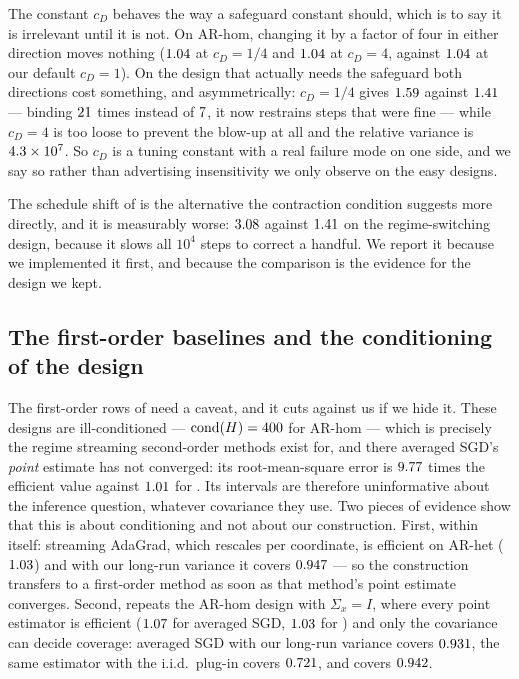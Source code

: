 The constant $c_D$ behaves the way a safeguard constant should, which is to say it is irrelevant
until it is not. On AR-hom, changing it by a factor of four in either direction moves nothing
($1.04$ at $c_D=1/4$ and $1.04$ at $c_D=4$, against
$1.04$ at our default $c_D=1$). On the design that actually needs the safeguard both
directions cost something, and asymmetrically: $c_D=1/4$ gives $1.59$ against
$1.41$ --- binding $21$ times instead of
$7$, it now restrains steps that were fine --- while $c_D=4$ is too loose to
prevent the blow-up at all and the relative variance is $4.3\times10^{7}$. So $c_D$ is a
tuning constant with a real failure mode on one side, and we say so rather than advertising
insensitivity we only observe on the easy designs.

The schedule shift of  is the alternative the contraction condition suggests more
directly, and it is measurably worse: $3.08$ against $1.41$ on the
regime-switching design, because it slows all $10^4$ steps to correct a handful. We report it
because we implemented it first, and because the comparison is the evidence for the design we
kept.

\subsection{The first-order baselines and the conditioning of the design}
\label{app:firstorder}

The first-order rows of  need a caveat, and it cuts against us if we hide it.
These designs are ill-conditioned --- $\mathrm{cond}(H)=400$ for AR-hom --- which is precisely
the regime streaming second-order methods exist for, and there averaged SGD's \emph{point}
estimate has not converged: its root-mean-square error is $9.77$ times the
efficient value against $1.01$ for \bgsn{}. Its intervals are therefore
uninformative about the inference question, whatever covariance they use. Two pieces of evidence show that this is about conditioning and not about our construction.
First, within  itself: streaming AdaGrad, which rescales per coordinate, is
efficient on AR-het ($1.03$) and with our long-run variance it covers
$0.947$ --- so the construction transfers to a first-order method as soon as that
method's point estimate converges. Second,  repeats the AR-hom design with
$\Sigma_x=I$, where every point estimator is efficient ($1.07$ for averaged SGD,
$1.03$ for \bgsn{}) and only the covariance can decide coverage: averaged SGD with our
long-run variance covers $0.931$, the same estimator with the i.i.d.\ plug-in covers
$0.721$, and \bgsn{} covers $0.942$.

